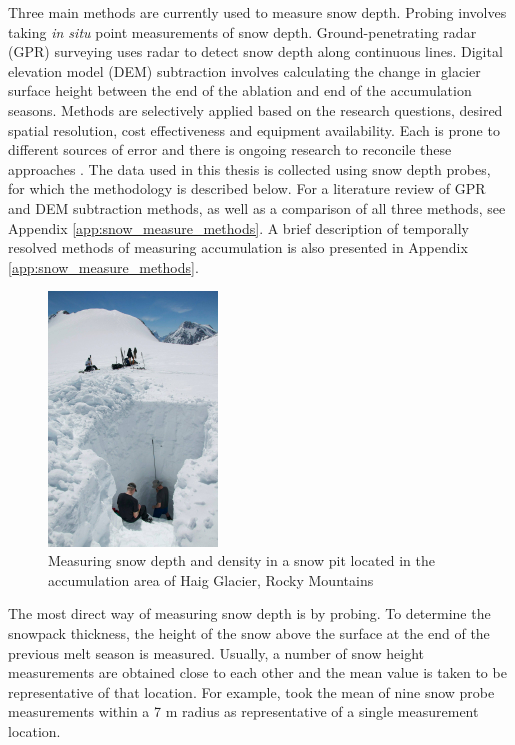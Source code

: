 \documentclass{sfuthesis}
\begin{document}
Three main methods are currently used to measure snow depth. Probing involves taking \textit{in situ} point measurements of snow depth. Ground-penetrating radar (GPR) surveying uses radar to detect snow depth along continuous lines. Digital elevation model (DEM) subtraction involves calculating the change in glacier surface height between the end of the ablation and end of the accumulation seasons. Methods are selectively applied based on the research questions, desired spatial resolution, cost effectiveness and equipment availability. Each is prone to different sources of error and there is ongoing research to reconcile these approaches \citep{Sold2014}. The data used in this thesis is collected using snow depth probes, for which the methodology is described below. For a literature review of GPR and DEM subtraction methods, as well as a comparison of all three methods, see Appendix \ref{app:snow_measure_methods}. A brief description of temporally resolved methods of measuring accumulation is also presented in Appendix \ref{app:snow_measure_methods}.

\label{snowprobing}
\begin{figure}[H]
 \centering
      \includegraphics[width=0.4\textwidth]{snowpit.jpg}
  \caption{Measuring snow depth and density in a snow pit located in the accumulation area of Haig Glacier, Rocky Mountains}
        \label{snowpit}
\end{figure}

The most direct way of measuring snow depth is by probing. To determine the snowpack thickness, the height of the snow above the surface at the end of the previous melt season is measured. Usually, a number of snow height measurements are obtained close to each other and the mean value is taken to be representative of that location. For example, \cite{Machguth2006} took the mean of nine snow probe measurements within a 7 m radius as representative of a single measurement location.  
\end{document}

